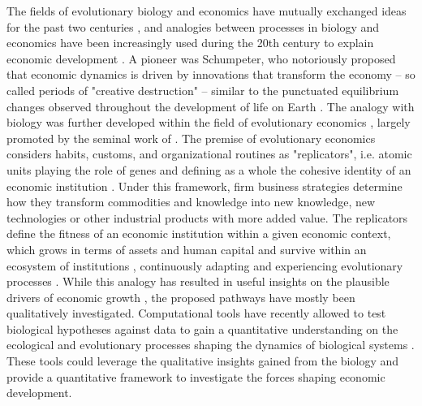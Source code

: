   The fields of evolutionary biology and economics have mutually exchanged ideas for the past two centuries \citep{Dopfer2007}, and analogies between processes in biology and economics have been increasingly used during the 20th century to explain economic development \citep{Ruth1996}.
  A pioneer was Schumpeter, who notoriously proposed that economic dynamics is driven by innovations that transform the economy -- so called periods of "creative destruction" \citep{schumpeter2017theory}-- similar to the punctuated equilibrium changes observed throughout the development of life on Earth \citep{gould1972}.
  The analogy with biology was further developed within the field of evolutionary economics \citep{Hodgson2019}, largely promoted by the seminal work of \citep{nelson1985evolutionary}.
  The premise of evolutionary economics considers habits, customs, and organizational routines as "replicators", i.e. atomic units playing the role of genes and defining as a whole the cohesive identity of an economic institution \citep{Hodgson2019}.
  Under this framework, firm business strategies determine how they transform commodities and knowledge into new knowledge, new technologies or other industrial products with more added value.
  The replicators define the fitness of an economic institution within a given economic context, which grows in terms of assets and human capital and survive within an ecosystem of institutions \citep{Hodgson2002}, continuously adapting and experiencing evolutionary processes \citep{Veblen1898}.
  While this analogy has resulted in useful insights on the plausible drivers of economic growth \citep{Dopfer2007}, the proposed pathways have mostly been qualitatively investigated.
  Computational tools have recently allowed to test biological hypotheses against data to gain a quantitative understanding on the ecological and evolutionary processes shaping the dynamics of biological systems \citep{Pontarp2019,Boussange2022,Boussange2022a}. These tools could leverage the qualitative insights gained from the biology and provide a quantitative framework to investigate the forces shaping economic development.
  
